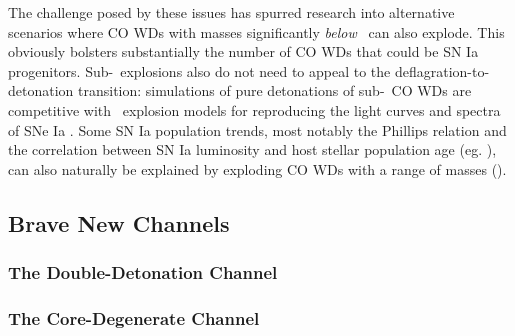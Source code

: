 {%


The challenge posed by these issues has spurred research into alternative scenarios where CO WDs with masses significantly \textit{below} \Mch\ can also explode.  This obviously bolsters substantially the number of CO WDs that could be SN Ia progenitors.  Sub-\Mch\ explosions also do not need to appeal to the deflagration-to-detonation transition: simulations of pure detonations of sub-\Mch\ CO WDs \citep{shig+92, sim+10} are competitive with \Mch\ explosion models for reproducing the light curves and spectra of SNe Ia \citep{none}.  Some SN Ia population trends, most notably the Phillips relation and the correlation between SN Ia luminosity and host stellar population age (eg. \cite{none}), can also naturally be explained by exploding CO WDs with a range of masses (\citeal{vkercj10}).



\subsection{Brave New Channels}

\subsubsection{The Double-Detonation Channel}

\subsubsection{The Core-Degenerate Channel}

}
